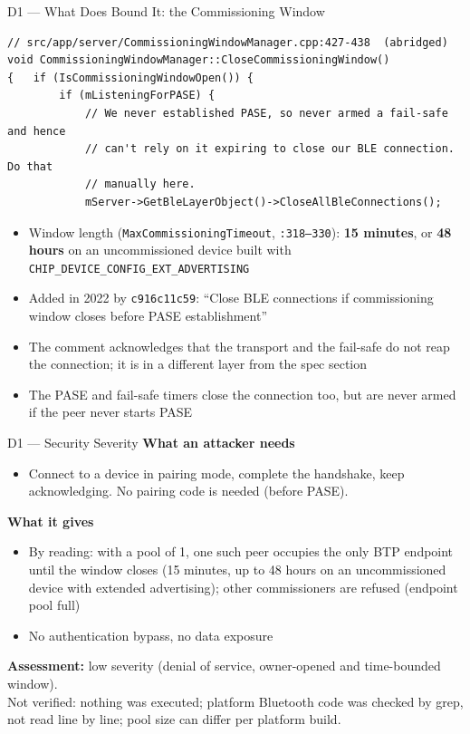 \documentclass[10pt,aspectratio=169,t]{beamer}
\begin{document}
\begin{frame}[fragile]{D1 --- What Does Bound It: the Commissioning Window}
\begin{lstlisting}[style=cppsmall]
// src/app/server/CommissioningWindowManager.cpp:427-438  (abridged)
void CommissioningWindowManager::CloseCommissioningWindow()
{   if (IsCommissioningWindowOpen()) {
        if (mListeningForPASE) {
            // We never established PASE, so never armed a fail-safe and hence
            // can't rely on it expiring to close our BLE connection.  Do that
            // manually here.
            mServer->GetBleLayerObject()->CloseAllBleConnections();
\end{lstlisting}
\begin{itemize}\small
  \item Window length (\texttt{MaxCommissioningTimeout}, \texttt{:318--330}):
        \textbf{15 minutes}, or \textbf{48 hours} on an uncommissioned device
        built with \texttt{CHIP\_DEVICE\_CONFIG\_EXT\_ADVERTISING}
  \item Added in 2022 by \texttt{c916c11c59}: ``Close BLE connections if
        commissioning window closes before PASE establishment''
  \item The comment acknowledges that the transport and the fail-safe do not
        reap the connection; it is in a different layer from the spec section
  \item The PASE and fail-safe timers close the connection too, but are never
        armed if the peer never starts PASE
\end{itemize}
\end{frame}

\begin{frame}{D1 --- Security Severity}
\textbf{What an attacker needs}
\begin{itemize}\small
  \item Connect to a device in pairing mode, complete the handshake, keep
        acknowledging. No pairing code is needed (before PASE).
\end{itemize}
\textbf{What it gives}
\begin{itemize}\small
  \item By reading: with a pool of 1, one such peer occupies the only BTP
        endpoint until the window closes (15 minutes, up to 48 hours on an
        uncommissioned device with extended advertising); other commissioners
        are refused (endpoint pool full)
  \item No authentication bypass, no data exposure
\end{itemize}
\textbf{Assessment:} low severity (denial of service, owner-opened and
time-bounded window).\\[2pt]
\small Not verified: nothing was executed; platform Bluetooth code was checked by
grep, not read line by line; pool size can differ per platform build.
\end{frame}
\end{document}
